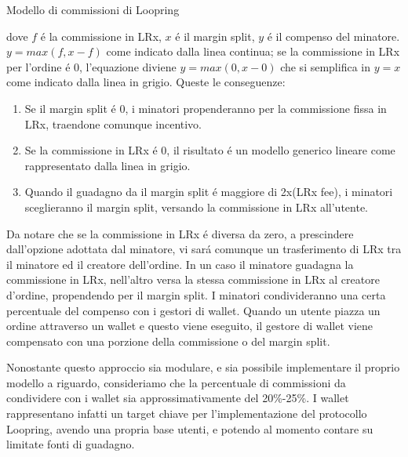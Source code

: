 \documentclass[UTF8,nofonts]{article}
\makeatletter
\newenvironment{figurehere}
 {\def\@captype{figure}}
 {}
\makeatother
\begin{document}
\begin{multicols}{2}
\begin{center}
\begin{figurehere}
\caption{Modello di commissioni di Loopring}
\label{fig:feemodel}
\end{figurehere}
\end{center}
dove $f$ \'e la commissione in LRx, $x$ \'e il margin split, $y$  \'e il compenso del minatore. $y=max(f, x-f)$ come indicato dalla linea continua; se la commissione in LRx per l'ordine \'e $0$, l'equazione diviene $y=max(0, x - 0)$ che si semplifica in $y=x$ come indicato dalla linea in grigio.
Queste le conseguenze:
\begin{enumerate}
	\item Se il margin split \'e 0, i minatori propenderanno per la commissione fissa in LRx, traendone comunque incentivo.
	\item Se la commissione in LRx \'e 0,  il risultato \'e un modello generico lineare come rappresentato dalla linea in grigio.
	\item Quando il guadagno da il margin  split  \'e maggiore di 2x(LRx  fee), i minatori  sceglieranno il margin split, versando la commissione in LRx all'utente.
\end{enumerate}
Da notare che se la commissione in LRx \'e diversa da zero, a prescindere dall'opzione adottata dal minatore, vi sar\'a comunque un trasferimento di LRx tra il minatore ed il creatore dell'ordine. In un caso il minatore guadagna la commissione in LRx, nell'altro versa la stessa commissione in LRx al creatore d'ordine, propendendo per il margin split.
I minatori condivideranno una certa percentuale del compenso con i gestori di wallet. Quando un utente piazza un ordine attraverso un wallet e questo viene eseguito, il gestore di wallet viene compensato con una porzione della commissione o del margin split.

Nonostante questo approccio sia modulare, e sia possibile implementare il proprio modello a riguardo, consideriamo che la percentuale di commissioni da condividere con i wallet sia approssimativamente del 20\%-25\%. I wallet rappresentano infatti un target chiave per l'implementazione del protocollo Loopring, avendo una propria base utenti, e potendo al momento contare su limitate fonti di guadagno.


\end{multicols}
\end{document}
